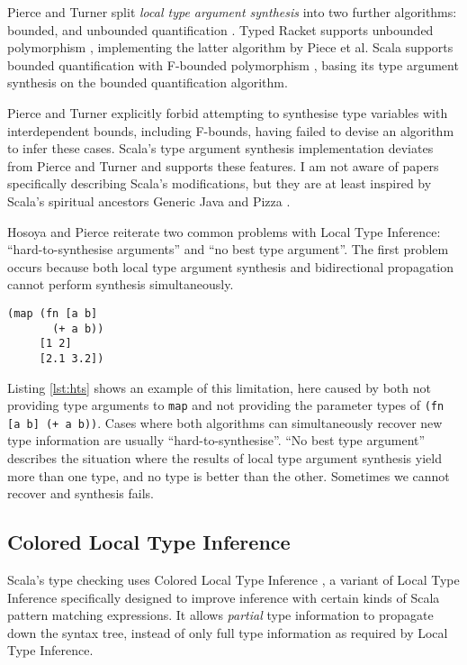 \documentclass[12pt, a4paper]{article}
\begin{document}
Pierce and Turner split \emph{local type argument synthesis} into two further
algorithms: bounded, and unbounded quantification \cite{Pierce:2000:LTI:345099.345100}. 
Typed Racket 
supports unbounded polymorphism \cite{SAMTH:dissertation}, implementing the latter algorithm by Piece et al.
Scala supports bounded quantification with F-bounded polymorphism \cite{Canning:1989:FPO:99370.99392},
basing its type argument synthesis on the bounded quantification algorithm.

Pierce and Turner explicitly forbid \cite{Pierce:2000:LTI:345099.345100}
attempting to synthesise type variables with interdependent bounds, including
F-bounds, having failed to devise an algorithm to infer these cases.
Scala's type argument synthesis implementation deviates from Pierce and Turner and supports these features.
I am not aware of papers specifically describing Scala's modifications, but they are at least inspired by
Scala's spiritual ancestors Generic Java \cite{Bracha98gj:extending} and Pizza \cite{Odersky97pizzainto}.

Hosoya and Pierce \cite{Hosoya99howgood} reiterate two common problems with Local Type Inference:
``hard-to-synthesise arguments'' and ``no best type argument''. The first problem occurs because
both local type argument synthesis and bidirectional propagation cannot perform synthesis
simultaneously. 

\begin{lstlisting}[caption=Hard-to-synthesise expression, label=lst:hts]
(map (fn [a b] 
       (+ a b)) 
     [1 2] 
     [2.1 3.2])
\end{lstlisting}

Listing \ref{lst:hts} shows an example of this limitation,
here caused by both not providing type arguments to \lstinline|map| and not providing the parameter types of \lstinline|(fn [a b] (+ a b))|.
 Cases where both algorithms can simultaneously recover new type information are usually ``hard-to-synthesise''.
``No best type argument'' describes the situation where the results of local
type argument synthesis yield more than one type, and no type is better than the other. Sometimes we cannot recover and synthesis
fails.

\subsection{Colored Local Type Inference}

Scala's type checking uses Colored Local Type Inference \cite{Odersky:2001:CLT:373243.360207},
a variant of Local Type Inference \cite{Pierce:2000:LTI:345099.345100} specifically designed to
improve inference with certain kinds of Scala pattern matching expressions. It allows
\emph{partial} type information to propagate down the syntax tree, instead of only full type information
as required by Local Type Inference.
\end{document}

